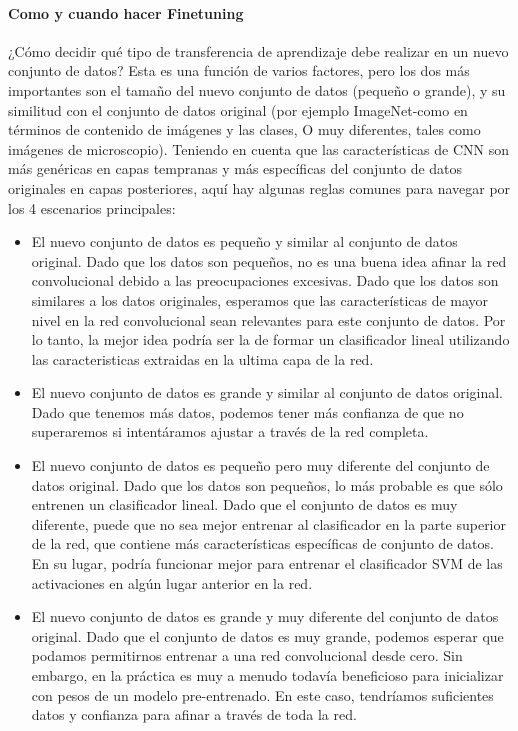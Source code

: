 \documentclass[a4paper,10pt]{article}
\begin{document}
      \paragraph{Como y cuando hacer Finetuning}
	¿Cómo decidir qué tipo de transferencia de aprendizaje debe realizar en un nuevo conjunto de datos? Esta es una función de varios factores, pero los dos más importantes son el 
	tamaño del nuevo conjunto de datos (pequeño o grande), y su similitud con el conjunto de datos original (por ejemplo ImageNet-como en términos de contenido de imágenes y las clases,
	O muy diferentes, tales como imágenes de microscopio). Teniendo en cuenta que las características de CNN son más genéricas en capas tempranas y más específicas del conjunto de datos
	originales en capas posteriores, aquí hay algunas reglas comunes para navegar por los 4 escenarios principales:
	\begin{itemize}
	  \item El nuevo conjunto de datos es pequeño y similar al conjunto de datos original. Dado que los datos son pequeños, no es una buena idea afinar la red convolucional debido a las 
	  preocupaciones excesivas. Dado que los datos son similares a los datos originales, esperamos que las características de mayor nivel en la red convolucional sean relevantes para este
	  conjunto de datos. Por lo tanto, la mejor idea podría ser la de formar un clasificador lineal utilizando las caracteristicas extraidas en la ultima capa de la red.
	  \item El nuevo conjunto de datos es grande y similar al conjunto de datos original. Dado que tenemos más datos, podemos tener más confianza de que no superaremos si intentáramos 
	  ajustar a través de la red completa.
	  \item El nuevo conjunto de datos es pequeño pero muy diferente del conjunto de datos original. Dado que los datos son pequeños, lo más probable es que sólo entrenen un clasificador 
	  lineal. Dado que el conjunto de datos es muy diferente, puede que no sea mejor entrenar al clasificador en la parte superior de la red, que contiene más características específicas
	  de conjunto de datos. En su lugar, podría funcionar mejor para entrenar el clasificador SVM de las activaciones en algún lugar anterior en la red.
	  \item El nuevo conjunto de datos es grande y muy diferente del conjunto de datos original. Dado que el conjunto de datos es muy grande, podemos esperar que podamos permitirnos 
	  entrenar a una red convolucional desde cero. Sin embargo, en la práctica es muy a menudo todavía beneficioso para inicializar con pesos de un modelo pre-entrenado. 
	  En este caso, tendríamos suficientes datos y confianza para afinar a través de toda la red.
	\end{itemize}
\end{document}
